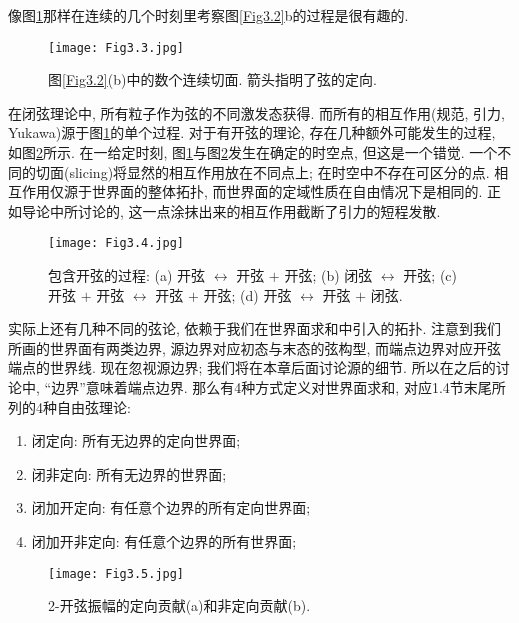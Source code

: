 像图\ref{Fig3.3}那样在连续的几个时刻里考察图\ref{Fig3.2}b的过程是很有趣的.
\begin{figure}
	\begin{center}
		\texttt{[image: Fig3.3.jpg]}\\
\caption{图\ref{Fig3.2}(b)中的数个连续切面. 箭头指明了弦的定向.}\label{Fig3.3}
	\end{center}
\end{figure}
在闭弦理论中, 所有粒子作为弦的不同激发态获得. 而所有的相互作用(规范, 引力, Yukawa)源于图\ref{Fig3.3}的单个过程. 对于有开弦的理论, 存在几种额外可能发生的过程, 如图\ref{fig:3.4}所示. 在一给定时刻, 图\ref{Fig3.3}与图\ref{fig:3.4}发生在确定的时空点, 但这是一个错觉. 一个不同的切面(slicing)将显然的相互作用放在不同点上; 在时空中不存在可区分的点. 相互作用仅源于世界面的整体拓扑, 而世界面的定域性质在自由情况下是相同的. 正如导论中所讨论的, 这一点涂抹出来的相互作用截断了引力的短程发散. 
\vspace{0.5cm}
\begin{figure}[h]
	\begin{center}
		\texttt{[image: Fig3.4.jpg]}\\
\caption{包含开弦的过程: (a) 开弦 $\leftrightarrow$ 开弦 $+$ 开弦; (b) 闭弦 $\leftrightarrow$ 开弦; (c) 开弦 $+$ 开弦 $\leftrightarrow$ 开弦 $+$ 开弦; (d) 开弦 $\leftrightarrow$ 开弦 $+$ 闭弦.}\label{fig:3.4}
	\end{center}
\end{figure}

实际上还有几种不同的弦论, 依赖于我们在世界面求和中引入的拓扑. 注意到我们所画的世界面有两类边界, 源边界对应初态与末态的弦构型, 而端点边界对应开弦端点的世界线. 现在忽视源边界; 我们将在本章后面讨论源的细节. 所以在之后的讨论中, “边界”意味着端点边界. 那么有4种方式定义对世界面求和, 对应1.4节末尾所列的4种自由弦理论:
\begin{enumerate}
	\item 闭定向: 所有无边界的定向世界面; 
	\item 闭非定向: 所有无边界的世界面; 
	\item 闭加开定向: 有任意个边界的所有定向世界面; 
	\item 闭加开非定向: 有任意个边界的所有世界面; 
\end{enumerate} 


\begin{figure}[h]
	\begin{center}
		\texttt{[image: Fig3.5.jpg]}\\
\caption{2-开弦振幅的定向贡献(a)和非定向贡献(b).}\label{Fig3.5}
	\end{center}
\end{figure}

